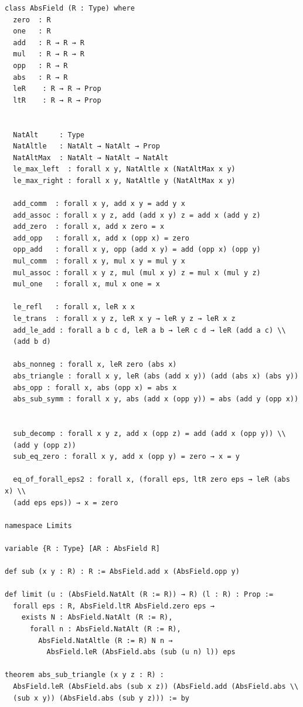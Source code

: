 \documentclass{article}
\begin{document}
\begin{verbatim}
class AbsField (R : Type) where
  zero  : R
  one   : R
  add   : R → R → R
  mul   : R → R → R
  opp   : R → R
  abs   : R → R
  leR    : R → R → Prop
  ltR    : R → R → Prop


  NatAlt     : Type
  NatAltle   : NatAlt → NatAlt → Prop
  NatAltMax  : NatAlt → NatAlt → NatAlt
  le_max_left  : forall x y, NatAltle x (NatAltMax x y)
  le_max_right : forall x y, NatAltle y (NatAltMax x y)

  add_comm  : forall x y, add x y = add y x
  add_assoc : forall x y z, add (add x y) z = add x (add y z)
  add_zero  : forall x, add x zero = x
  add_opp   : forall x, add x (opp x) = zero
  opp_add   : forall x y, opp (add x y) = add (opp x) (opp y)
  mul_comm  : forall x y, mul x y = mul y x
  mul_assoc : forall x y z, mul (mul x y) z = mul x (mul y z)
  mul_one   : forall x, mul x one = x

  le_refl   : forall x, leR x x
  le_trans  : forall x y z, leR x y → leR y z → leR x z
  add_le_add : forall a b c d, leR a b → leR c d → leR (add a c) \\
  (add b d)

  abs_nonneg : forall x, leR zero (abs x)
  abs_triangle : forall x y, leR (abs (add x y)) (add (abs x) (abs y))
  abs_opp : forall x, abs (opp x) = abs x
  abs_sub_symm : forall x y, abs (add x (opp y)) = abs (add y (opp x))


  sub_decomp : forall x y z, add x (opp z) = add (add x (opp y)) \\
  (add y (opp z))
  sub_eq_zero : forall x y, add x (opp y) = zero → x = y

  eq_of_forall_eps2 : forall x, (forall eps, ltR zero eps → leR (abs x) \\
  (add eps eps)) → x = zero

namespace Limits

variable {R : Type} [AR : AbsField R]

def sub (x y : R) : R := AbsField.add x (AbsField.opp y)

def limit (u : (AbsField.NatAlt (R := R)) → R) (l : R) : Prop :=
  forall eps : R, AbsField.ltR AbsField.zero eps →
    exists N : AbsField.NatAlt (R := R),
      forall n : AbsField.NatAlt (R := R),
        AbsField.NatAltle (R := R) N n →
          AbsField.leR (AbsField.abs (sub (u n) l)) eps

theorem abs_sub_triangle (x y z : R) :
  AbsField.leR (AbsField.abs (sub x z)) (AbsField.add (AbsField.abs \\
  (sub x y)) (AbsField.abs (sub y z))) := by


\end{verbatim}
\end{document}
